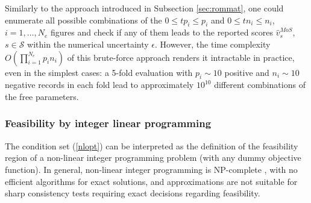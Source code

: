 \documentclass[3p, times]{elsarticle}
\begin{document}
Similarly to the approach introduced in Subsection \ref{sec:rommat}, one could enumerate all possible combinations of the $0 \leq tp_i \leq p_i$ and $0 \leq tn_i \leq n_i$, $i=1, \dots, N_e$ figures and check if any of them leads to the reported scores $\hat{v}_s^{MoS}$, $s\in\mathcal{S}$ within the numerical uncertainty $\epsilon$. However, the time complexity $O\left(\prod_{i=1}^{N_e}p_in_i\right)$ of this brute-force approach renders it intractable in practice, even in the simplest cases: a 5-fold evaluation with $p_i\sim 10$ positive and $n_i\sim 10$ negative records in each fold lead to approximately $10^{10}$ different combinations of the free parameters. 

\subsubsection{Feasibility by integer linear programming}
\label{sec:moslinprog}

The condition set (\ref{nlopt}) can be interpreted as the definition of the feasibility region of a non-linear integer programming problem (with any dummy objective function). In general, non-linear integer programming is NP-complete \cite{ip}, with no efficient algorithms for exact solutions, and approximations are not suitable for sharp consistency tests requiring exact decisions regarding feasibility. 
\end{document}
